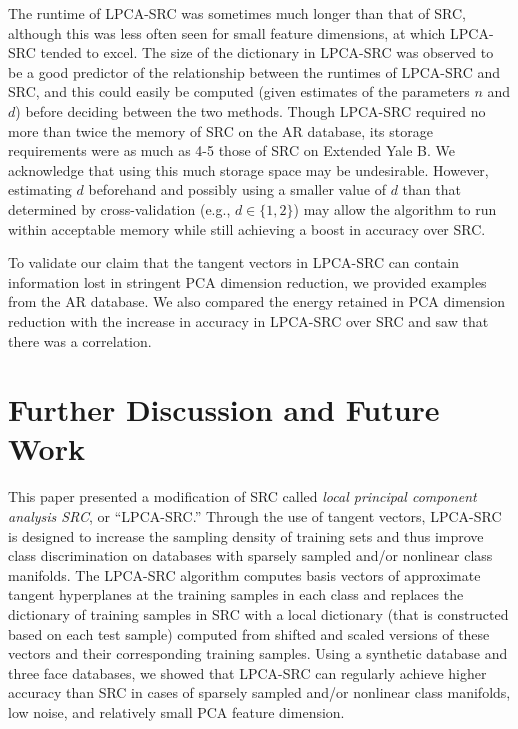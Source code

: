 \documentclass[review]{elsarticle}
\begin{document}
The runtime of LPCA-SRC was sometimes much longer than that of SRC, although this was less often seen for small feature dimensions, at which LPCA-SRC tended to excel. The size of the dictionary in LPCA-SRC was observed to be a good predictor of the relationship between the runtimes of LPCA-SRC and SRC, and this could easily be computed (given estimates of the parameters $n$ and $d$) before deciding between the two methods. Though LPCA-SRC required no more than twice the memory of SRC on the AR database, its storage requirements were as much as 4-5 those of SRC on Extended Yale B. We acknowledge that using this much storage space may be undesirable. However, estimating $d$ beforehand and possibly using a smaller value of $d$ than that determined by cross-validation (e.g., $d\in \{1,2\}$) may allow the algorithm to run within acceptable memory while still achieving a boost in accuracy over SRC. 

To validate our claim that the tangent vectors in LPCA-SRC can contain information lost in stringent PCA dimension reduction, we provided examples from the AR database. We also compared the energy retained in PCA dimension reduction with the increase in accuracy in LPCA-SRC over SRC and saw that there was a correlation.



\section{Further Discussion and Future Work} \label{sec:fut_work}

This paper presented a modification of SRC called \emph{local principal component analysis SRC}, or ``LPCA-SRC.'' Through the use of tangent vectors, LPCA-SRC is designed to increase the sampling density of training sets and thus improve class discrimination on databases with sparsely sampled and/or nonlinear class manifolds. The LPCA-SRC algorithm computes basis vectors of approximate tangent hyperplanes at the training samples in each class and replaces the dictionary of training samples in SRC with a local dictionary (that is constructed based on each test sample) computed from shifted and scaled versions of these vectors and their corresponding training samples. Using a synthetic database and three face databases, we showed that LPCA-SRC can regularly achieve higher accuracy than SRC in cases of sparsely sampled and/or nonlinear class manifolds, low noise, and relatively small PCA feature dimension.
\end{document}
